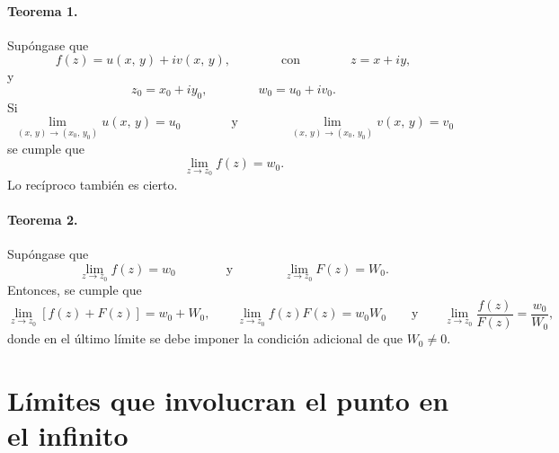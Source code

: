 \documentclass[a4paper]{report}
\begin{document}
\paragraph{Teorema 1.} Supóngase que 
\[
 f(z)=u(x,\,y)+iv(x,\,y),\qquad\qquad\textrm{con}\qquad\qquad z=x+iy,
\]
y
\[
 z_0=x_0+iy_0,\qquad\qquad w_0=u_0+iv_0.
\]
Si
\[
 \lim_{(x,\,y)\to(x_0,\,y_0)}u(x,\,y)=u_0
 \qquad\qquad\textrm{y}\qquad\qquad
 \lim_{(x,\,y)\to(x_0,\,y_0)}v(x,\,y)=v_0
\]
se cumple que 
\[
 \lim_{z\to z_0}f(z)=w_0.
\]
Lo recíproco también es cierto.

\paragraph{Teorema 2.} Supóngase que
\[
 \lim_{z\to z_0}f(z)=w_0
 \qquad\qquad\textrm{y}\qquad\qquad
 \lim_{z\to z_0}F(z)=W_0.
\]
Entonces, se cumple que 
\begin{equation}\label{eq:limits_functions_operations}
 \lim_{z\to z_0}[f(z)+F(z)]=w_0+W_0,
 \qquad
 \lim_{z\to z_0}f(z)F(z)=w_0W_0
 \qquad\textrm{y}\qquad 
 \lim_{z\to z_0}\frac{f(z)}{F(z)}=\frac{w_0}{W_0},
\end{equation}
donde en el último límite se debe imponer la condición adicional de que \(W_0\neq0\).

\section{Límites que involucran el punto en el infinito}\label{sec:limits_infinity_point}
\end{document}
